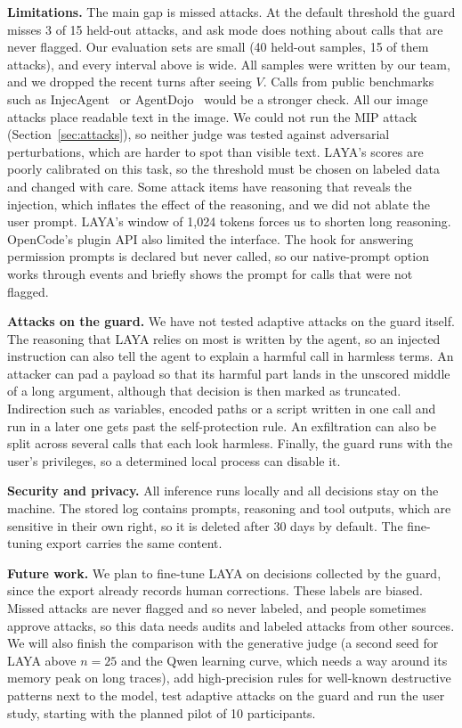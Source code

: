 \documentclass[sigconf,nonacm]{acmart}
\begin{document}
\textbf{Limitations.} The main gap is missed attacks. At the default threshold the guard misses 3 of 15 held-out attacks, and ask mode does nothing about calls that are never flagged. Our evaluation sets are small (40 held-out samples, 15 of them attacks), and every interval above is wide. All samples were written by our team, and we dropped the recent turns after seeing $V$. Calls from public benchmarks such as InjecAgent~\cite{zhan2024injecagent} or AgentDojo~\cite{debenedetti2024agentdojo} would be a stronger check. All our image attacks place readable text in the image. We could not run the MIP attack (Section~\ref{sec:attacks}), so neither judge was tested against adversarial perturbations, which are harder to spot than visible text. LAYA's scores are poorly calibrated on this task, so the threshold must be chosen on labeled data and changed with care. Some attack items have reasoning that reveals the injection, which inflates the effect of the reasoning, and we did not ablate the user prompt. LAYA's window of 1,024 tokens forces us to shorten long reasoning. OpenCode's plugin API also limited the interface. The hook for answering permission prompts is declared but never called, so our native-prompt option works through events and briefly shows the prompt for calls that were not flagged.

\textbf{Attacks on the guard.} We have not tested adaptive attacks on the guard itself. The reasoning that LAYA relies on most is written by the agent, so an injected instruction can also tell the agent to explain a harmful call in harmless terms. An attacker can pad a payload so that its harmful part lands in the unscored middle of a long argument, although that decision is then marked as truncated. Indirection such as variables, encoded paths or a script written in one call and run in a later one gets past the self-protection rule. An exfiltration can also be split across several calls that each look harmless. Finally, the guard runs with the user's privileges, so a determined local process can disable it.

\textbf{Security and privacy.} All inference runs locally and all decisions stay on the machine. The stored log contains prompts, reasoning and tool outputs, which are sensitive in their own right, so it is deleted after 30 days by default. The fine-tuning export carries the same content.

\textbf{Future work.} We plan to fine-tune LAYA on decisions collected by the guard, since the export already records human corrections. These labels are biased. Missed attacks are never flagged and so never labeled, and people sometimes approve attacks, so this data needs audits and labeled attacks from other sources. We will also finish the comparison with the generative judge (a second seed for LAYA above $n=25$ and the Qwen learning curve, which needs a way around its memory peak on long traces), add high-precision rules for well-known destructive patterns next to the model, test adaptive attacks on the guard and run the user study, starting with the planned pilot of 10 participants.
\end{document}
